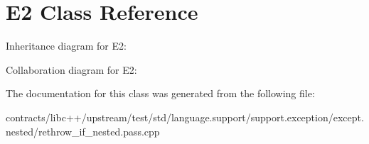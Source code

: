 \hypertarget{class_e2}{}\section{E2 Class Reference}
\label{class_e2}


Inheritance diagram for E2\+:


Collaboration diagram for E2\+:


The documentation for this class was generated from the following file\+:\begin{DoxyCompactItemize}
\item 
contracts/libc++/upstream/test/std/language.\+support/support.\+exception/except.\+nested/rethrow\+\_\+if\+\_\+nested.\+pass.\+cpp\end{DoxyCompactItemize}
